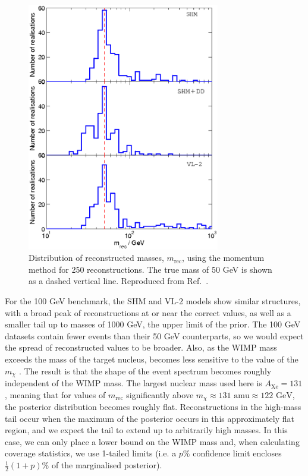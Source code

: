  \begin{figure}[t]
\centering
\includegraphics[width=0.75\textwidth]{Speed/50GeV-1.eps}
\caption[Distribution of reconstructed masses using the binned momentum distribution for a 50 GeV WIMP with SHM, SHM+DD and VL2 distribution functions]{Distribution of reconstructed masses, \(m_\textrm{rec}\), using the momentum method for 250 reconstructions. The true mass of 50 GeV is shown as a dashed vertical line. Reproduced from Ref.~\cite{Kavanagh:2012}.}
  \label{fig:Speed:recons50}
\end{figure}


For the 100 GeV benchmark, the SHM and VL-2 models show similar structures, with a broad peak of reconstructions at or near the correct values, as well as a smaller tail up to masses of 1000 GeV, the upper limit of the prior. The 100 GeV datasets contain fewer events than their 50 GeV counterparts, so we would expect the spread of reconstructed values to be broader. Also, as the WIMP mass exceeds the mass of the target nucleus, \vmin becomes less sensitive to the value of the $m_\chi$ \cite{Peter:2011}. The result is that the shape of the event spectrum becomes roughly independent of the WIMP mass. The largest nuclear mass used here is \(A_\textrm{Xe} = 131\), meaning that for values of \(m_\textrm{rec}\) significantly above \(m_\chi \approx 131 \textrm{ amu} \approx 122 \textrm{ GeV}\), the posterior distribution becomes roughly flat. Reconstructions in the high-mass tail occur when the maximum of the posterior occurs in this approximately flat region, and we expect the tail to extend up to arbitrarily high masses. In this case, we can only place a lower bound on the WIMP mass and, when calculating coverage statistics, we use 1-tailed limits (i.e. a \(p\%\) confidence limit encloses \(\frac{1}{2}(1+p) \%\) of the marginalised posterior).

